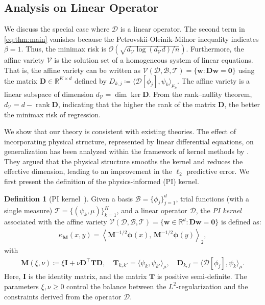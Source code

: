 \documentclass{article}
\makeatletter
\def\mD{{\bm{D}}}
\def\mI{{\bm{I}}}
\def\mM{{\bm{M}}}
\def\mT{{\bm{T}}}
\def\emD{{D}}
\def\@onedot{\ifx\@let@token.\else.\null\fi\xspace}
\DeclareRobustCommand\onedot{\futurelet\@let@token\@onedot}
\def\ie{\emph{i.e}\onedot}
\theoremstyle{plain}
\theoremstyle{definition}
\newtheorem{definition}[theorem]{Definition}
\theoremstyle{remark}
\makeatother
\begin{document}
\subsection{Analysis on Linear Operator}
\label{sec:linop}
We discuss the special case where \( \mathscr{D} \) is a linear operator. The second term in \cref{eq:thm:main} vanishes because the Petrovskii-Oleinik-Milnor inequality indicates \( \beta = 1 \). Thus, the minimax risk is \( \mathcal{O}\left(\sqrt{d_{\mathcal{V}} \log (d_{\mathcal{V}}d) / n}\right) \). Furthermore, the affine variety \( \mathcal{V} \) is the solution set of a homogeneous system of linear equations. That is, the affine variety can be written as \( \mathcal{V}(\mathscr{D}, \mathcal{B}, \mathcal{T}) = \{ \bm{w} : \mD \bm{w} = \bm{0} \} \) using the matrix \( \mD \in \mathbb{R}^{K \times d} \) defined by \(\emD_{k, j} \coloneqq \langle \mathscr{D}[\phi_j], \psi_{k} \rangle_{\mu_k}\). The affine variety is a linear subspace of dimension \( d_{\mathcal{V}} = \dim \ker \mD \). From the rank–nullity theorem, \( d_{\mathcal{V}} = d - \operatorname{rank} \mD \), indicating that the higher the rank of the matrix \( \mD \), the better the minimax risk of regression. 

We show that our theory is consistent with existing theories. The effect of incorporating physical structure, represented by linear differential equations, on generalization has been analyzed within the framework of kernel methods by \citet{doumeche2024physics,doumeche2024physics2}. They argued that the physical structure smooths the kernel and reduces the effective dimension, leading to an improvement in the \(\ell_2\) predictive error. We first present the definition of the physics-informed (PI) kernel. 
\begin{definition}[PI kernel~\citep{doumeche2024physics,doumeche2024physics2}]
\label{def:pi-kernel}
Given a basis \( \mathcal{B} = \{ \phi_j \}_{j=1}^d \), trial functions (with a single measure) \( \mathcal{T} = \{ (\psi_k, \mu) \}_{k=1}^K \), and a linear operator \(\mathscr{D}\), the \emph{PI kernel} associated with the affine variety $\mathcal{V}(\mathscr{D}, \mathcal{B}, \mathcal{T}) = \{\bm{w}\in\mathbb{R}^d: \mD\bm{w} = \bm{0}\}$ is defined as:
\begin{align}
\label{eq:def-pi-kernel}
\kappa_{\mM}(x,y) = \left\langle \mM^{-1/2}\bm{\phi}(x),\,\mM^{-1/2}\bm{\phi}(y)\right\rangle_{2},
\end{align}
with
\begin{align*}
\mM(\xi, \nu) \coloneqq \xi \mI + \nu \mD^\top \mT \mD,\quad \mT_{k,k'} = \langle \psi_k,\psi_{k'} \rangle_{\mu}, \quad
\mD_{k,j} = \langle \mathscr{D}[\phi_j],\psi_k\rangle_{\mu}.
\end{align*}
Here, \(\mI\) is the identity matrix, and the matrix $\mT$ is positive semi-definite. The parameters \(\xi,\nu \geq 0\) control the balance between the \(L^2\)-regularization and the constraints derived from the operator \(\mathscr{D}\). 
\end{definition}
\end{document}
